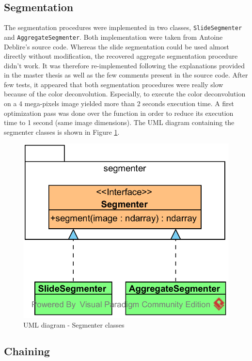 \subsection{Segmentation}

The segmentation procedures were implemented in two classes, \texttt{SlideSegmenter} and \texttt{AggregateSegmenter}. Both implementation were taken from Antoine Deblire's source code. Whereas the slide segmentation could be used almost directly without modification, the recovered aggregate segmentation procedure didn't work. It was therefore re-implemented following the explanations provided in the master thesis as well as the few comments present in the source code. After few tests, it appeared that both segmentation procedures were really slow because of the color deconvolution. Especially, to execute the color deconvolution on a 4 mega-pixels image yielded more than 2 seconds execution time. A first optimization pass was done over the function in order to reduce its execution time to 1 second (same image dimensions). The UML diagram containing the segmenter classes is shown in Figure \ref{fig:uml_cyto_segmenters}.

\begin{figure}
	\center
	\includegraphics[scale=0.85]{image/thyroid_segmenters.png}
	\caption{UML diagram - Segmenter classes}
	\label{fig:uml_cyto_segmenters}
\end{figure}

\subsection{Chaining}

